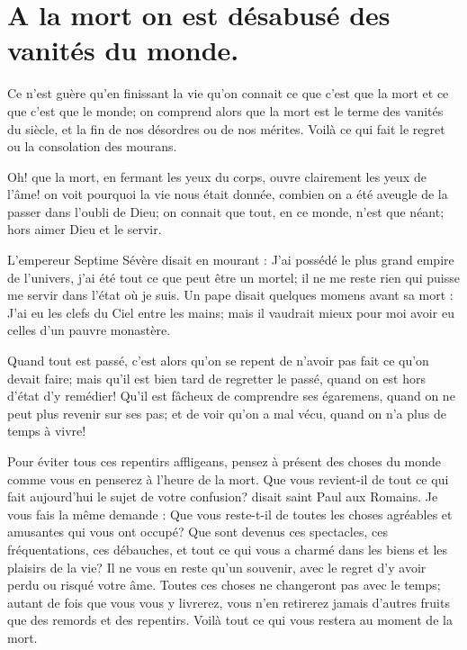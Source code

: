 \documentclass[instructions.tex]{subfiles}
\begin{document}
 
\chapter{A la mort on est désabusé des vanités du monde.}
 
Ce n’est guère qu’en finissant la vie qu’on connait ce que c’est que la mort et ce que c’est que le monde; on comprend alors que la mort est le terme des vanités du siècle, et la fin de nos désordres ou de nos mérites. Voilà ce qui fait le regret ou la consolation des mourans.
 
\primo Oh! que la mort, en fermant les yeux du corps, ouvre clairement les yeux de l’âme! on voit pourquoi la vie nous était donnée, combien on a été aveugle de la passer dans l’oubli de Dieu; on connait que tout, en ce monde, n’est que néant; hors aimer Dieu et le servir.
 
L’empereur Septime Sévère disait en mourant : J’ai possédé le plus grand empire de l’univers, j’ai été tout ce que peut être un mortel; il ne me reste rien qui puisse me servir dans l’état où je suis. Un pape disait quelques momens avant sa mort : J’ai eu les clefs du Ciel entre les mains; mais il vaudrait mieux pour moi avoir eu celles d’un pauvre monastère.
 
Quand tout est passé, c’est alors qu’on se repent de n’avoir pas fait ce qu’on devait faire; mais qu’il est bien tard de regretter le passé, quand on est hors d’état d’y remédier! Qu’il est fâcheux de comprendre ses égaremens, quand on ne peut plus revenir sur ses pas; et de voir qu’on a mal vécu, quand on n’a plus de temps à vivre!
 
Pour éviter tous ces repentirs affligeans, pensez à présent des choses du monde comme vous en penserez à l’heure de la mort. Que vous revient-il de tout ce qui fait aujourd’hui le sujet de votre confusion? disait saint Paul aux Romains. Je vous fais la même demande : Que vous reste-t-il de toutes les choses agréables et amusantes qui vous ont occupé? Que sont devenus ces spectacles, ces fréquentations, ces débauches, et tout ce qui vous a charmé dans les biens et les plaisirs de la vie? Il ne vous en reste qu’un souvenir, avec le regret d’y avoir perdu ou risqué votre âme. Toutes ces choses ne changeront pas avec le temps; autant de fois que vous vous y livrerez, vous n’en retirerez jamais d’autres fruits que des remords et des repentirs. Voilà tout ce qui vous restera au moment de la mort.
 
\end{document}

